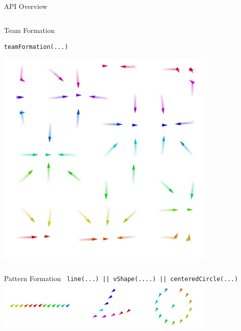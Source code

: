 \documentclass[presentation, 9pt]{beamer}\mode<presentation>{\usetheme{AMSBolognaFC}}
\begin{document}
\begin{frame}[fragile]{API Overview}
\begin{columns}
\begin{column}{0.31\textwidth}
	\begin{exampleblock}{Team Formation}

\begin{verbatim}
teamFormation(...)
\end{verbatim}
	\centering
	\includegraphics[width=0.8\textwidth]{img/team-formation-base.png}
	\end{exampleblock}
\end{column}
	
\end{columns}
\begin{exampleblock}{Pattern Formation\emph{\tiny{~\cite{DBLP:journals/ras/OhSSJ17}}}}
\centering
\texttt{line(...) || vShape(....) || centeredCircle(...)}
\includegraphics[width=0.8\textwidth]{img/shapes.png}
\end{exampleblock}
\end{frame}
\end{document}
